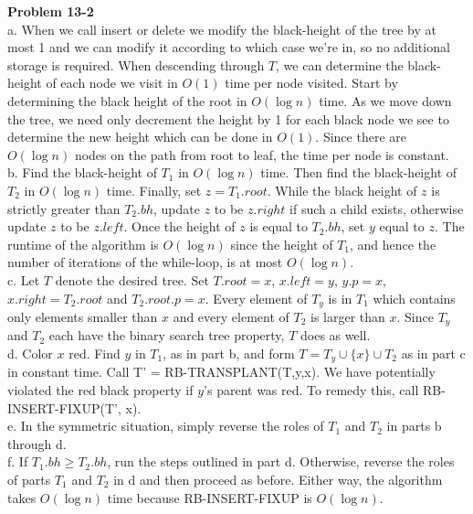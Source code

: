 \documentclass{article}
\begin{document}
\noindent\textbf{Problem 13-2}\\

a. When we call insert or delete we modify the black-height of the tree by at most 1 and we can modify it according to which case we're in, so no additional storage is required. When descending through $T$, we can determine the black-height of each node we visit in $O(1)$ time per node visited.  Start by determining the black height of the root in $O(\log n)$ time.  As we move down the tree, we need only decrement the height by 1 for each black node we see to determine the new height which can be done in $O(1)$.  Since there are $O(\log n)$ nodes on the path from root to leaf, the time per node is constant. \\

b. Find the black-height of $T_1$ in $O(\log n)$ time. Then find the black-height of $T_2$ in $O(\log n)$ time.  Finally, set $z = T_1.root$.  While the black height of $z$ is strictly greater than $T_2.bh$, update $z$ to be $z.right$ if such a child exists, otherwise update $z$ to be $z.left$.  Once the height of $z$ is equal to $T_2.bh$, set $y$ equal to $z$.  The runtime of the algorithm is $O(\log n)$ since the height of $T_1$, and hence the number of iterations of the while-loop, is at most $O(\log n)$.\\

c. Let $T$ denote the desired tree.  Set $T.root = x$, $x.left = y$, $y.p = x$, $x.right = T_2.root$ and $T_2.root.p = x$.  Every element of $T_y$ is in $T_1$ which contains only elements smaller than $x$ and every element of $T_2$ is larger than $x$.  Since $T_y$ and $T_2$ each have the binary search tree property, $T$ does as well. \\

d. Color $x$ red.  Find $y$ in $T_1$, as in part b, and form $T = T_y \cup \{ x \} \cup T_2$ as in part c in constant time.  Call T' = RB-TRANSPLANT(T,y,x).  We have potentially violated the red black property if $y$'s parent was red.  To remedy this, call RB-INSERT-FIXUP(T', x).\\

e. In the symmetric situation, simply reverse the roles of $T_1$ and $T_2$ in parts b through d. \\

f.  If $T_1.bh \geq T_2.bh$, run the steps outlined in part d.  Otherwise, reverse the roles of parts $T_1$ and $T_2$ in d and then proceed as before.  Either way, the algorithm takes $O(\log n)$ time because RB-INSERT-FIXUP is $O(\log n)$.
\end{document}
